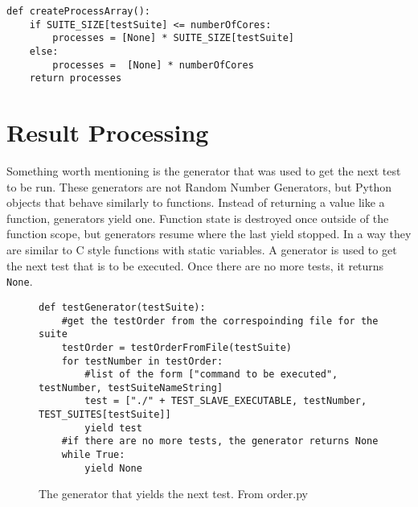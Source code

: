 \begin{verbatim}
def createProcessArray():
    if SUITE_SIZE[testSuite] <= numberOfCores:
        processes = [None] * SUITE_SIZE[testSuite]
    else:
        processes =  [None] * numberOfCores
    return processes
\end{verbatim}
\section{Result Processing}

Something worth mentioning is the generator that was used to get the next test to be run. These generators are not Random Number Generators, but Python objects that behave similarly to functions. Instead of returning a value like a function, generators yield one. Function state is destroyed once outside of the function scope, but generators resume where the last yield stopped. In a way they are similar to C style functions with static variables. A generator is used to get the next test that is to be executed. Once there are no more tests, it returns \texttt{None}.

\begin{figure}[h]
\begin{verbatim}
def testGenerator(testSuite):
    #get the testOrder from the correspoinding file for the suite
    testOrder = testOrderFromFile(testSuite)
    for testNumber in testOrder:
        #list of the form ["command to be executed", testNumber, testSuiteNameString]
        test = ["./" + TEST_SLAVE_EXECUTABLE, testNumber, TEST_SUITES[testSuite]]
        yield test
    #if there are no more tests, the generator returns None
    while True:
        yield None
\end{verbatim}
        \caption{The generator that yields the next test. From order.py}
        \label{fig:generator_address}
\end{figure}

